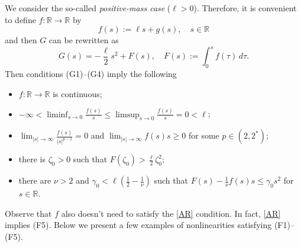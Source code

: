 \documentclass[12pt,leqno,twoside,sort]{amsart}
\newcommand{\R}{\mathbb{R}}
\numberwithin{equation}{section}
\begin{document}
We consider the so-called \textit{positive-mass case} ($\ell > 0$). Therefore, it is convenient to define $f : \R \rightarrow \R$ by
\begin{equation}\label{def:f}
f(s) := \ell s + g(s), \quad s \in \R
\end{equation}
and then $G$ can be rewritten as
$$
G(s) = -\frac{\ell}{2} s^2 + F(s), \quad F(s) := \int_0^s f(\tau) \, d\tau.
$$
Then conditions (G1)--(G4) imply the following
\begin{itemize}
\item[(F1)] $f : \R \rightarrow \R$ is continuous;
\item[(F2)] $-\infty < \liminf_{s \to 0}  \frac{f(s)}{s} \leq \limsup_{s \to 0} \frac{f(s)}{s} = 0 < \ell$;
\item[(F3)] $\lim_{|s| \to \infty} \frac{f(s)}{|s|^{p-1}} = 0$ and $\lim_{|s| \to \infty} f(s)s \geq 0$ for some $p \in \left( 2, 2^* \right)$;
\item[(F4)] there is $\zeta_0 > 0$ such that $F(\zeta_0) > \frac{\ell}{2} \zeta_0^2$;
\item [(F5)] there are $\nu > 2$ and $\gamma_0 < \ell\left(\frac 12-\frac 1\nu\right)$ such that
$F(s) - \frac{1}{\nu} f(s)s \leq \gamma_0 s^2$ for $s\in\R$.
\end{itemize}
Observe that $f$ also doesn't need to satisfy the \eqref{AR} condition. In fact, \eqref{AR} implies (F5). Below we present a few examples of nonlinearities satisfying (F1)--(F5).
\end{document}
